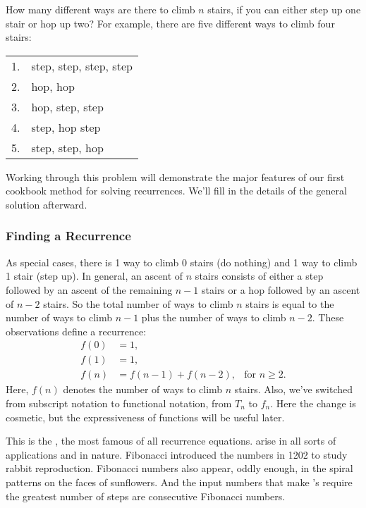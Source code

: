 How many different ways are there to climb $n$ stairs, if you can
either step up one stair or hop up two?  For example, there are five
different ways to climb four stairs:

\vspace{1ex}

\begin{tabular}{rl}
1. & step, step, step, step \\
2. & hop, hop \\
3. & hop, step, step \\
4. & step, hop step \\
5. & step, step, hop
\end{tabular}

\vspace{1ex}

\noindent Working through this problem will demonstrate the major
features of our first cookbook method for solving recurrences.  We'll
fill in the details of the general solution afterward.

\subsubsection{Finding a Recurrence}

As special cases, there is 1 way to climb 0 stairs (do nothing) and 1
way to climb 1 stair (step up).  In general, an ascent of $n$ stairs
consists of either a step followed by an ascent of the remaining $n -
1$ stairs or a hop followed by an ascent of $n - 2$ stairs.  So the
total number of ways to climb $n$ stairs is equal to the number of
ways to climb $n-1$ plus the number of ways to climb $n-2$.  These
observations define a recurrence:
\begin{align*}
f(0) & = 1, \\
f(1) & = 1, \\
f(n) & = f(n-1) + f(n-2), & \text{for $n \geq 2$}.
\end{align*}
Here, $f(n)$ denotes the number of ways to climb $n$ stairs.  Also,
we've switched from subscript notation to functional notation, from
$T_n$ to $f_n$.  Here the change is cosmetic, but the expressiveness
of functions will be useful later.

This is the , the most famous of all
recurrence equations.   arise in all sorts of
applications and in nature.  Fibonacci introduced the numbers in 1202
to study rabbit reproduction.  Fibonacci numbers also appear, oddly
enough, in the spiral patterns on the faces of sunflowers.  And the
input numbers that make 's  require the greatest
number of steps are consecutive Fibonacci numbers.

